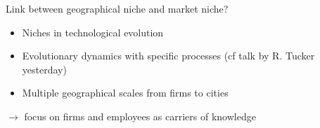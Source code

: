 \documentclass[english,11pt]{beamer}
\begin{document}
{\bigskip

Link between geographical niche and market niche?

\medskip

\begin{itemize}
	\item Niches in technological evolution \cite{schot2007niches}
	\item Evolutionary dynamics with specific processes (cf talk by R. Tucker yesterday) \cite{schamp2010notion}
	\item Multiple geographical scales from firms to cities \cite{raimbault2020model}
\end{itemize}

\medskip

$\rightarrow$ focus on firms and employees as carriers of knowledge \cite{song2016innovation}

}
\end{document}
